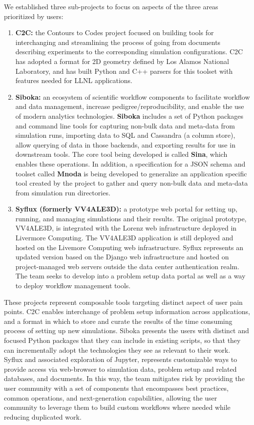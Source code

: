 We established three sub-projects to focus on aspects of the three areas prioritized by users:
\begin{enumerate}
\item \textbf{C2C:} the Contours to Codes project focused on building tools for
interchanging and streamlining the process of going from documents describing
experiments to the corresponding simulation configurations. C2C has adopted a
format for 2D geometry defined by Los Alamos National Laboratory, and has built
Python and C++ parsers for this toolset with features needed for LLNL
applications.  
\item \textbf{Siboka:} an ecosystem of scientific workflow components to
facilitate workflow and data management, increase pedigree/reproducibility, and
enable the use of modern analytics technologies.  \textbf{Siboka} includes a
set of Python packages and command line tools for capturing non-bulk data and
meta-data from simulation runs, importing data to SQL and Cassandra (a column
store), allow querying of data in those backends, and exporting results for use
in downstream tools. The core tool being developed is called \textbf{Sina},
which enables these  operations. In addition, a specification for a JSON
schema and toolset called \textbf{Mnoda} is being developed to generalize an
application specific tool created by the project to gather and query non-bulk
data and meta-data from simulation run directories.
\item \textbf{Syflux (formerly VV4ALE3D):} a prototype web portal for setting
up, running, and managing simulations and their results.  The original
prototype, VV4ALE3D, is integrated with the Lorenz web infrastructure deployed
in Livermore Computing.  The VV4ALE3D application is still deployed and hosted
on the Livemore Computing web infrastructure.  Syflux represents an updated
version based on the Django web infrastructure and hosted on project-managed
web servers outside the data center authentication realm. The team seeks to
develop into a problem setup data portal as well as a way to deploy workflow
management tools.  
\end{enumerate}
These projects represent composable tools targeting distinct aspect of user
pain points.  C2C enables interchange of problem setup information across
applications, and a format in which to store and curate the results of the time
consuming process of setting up new simulations.  Siboka presents the users
with distinct and focused Python packages that they can include in existing
scripts, so that they can incrementally adopt the technologies they see as
relevant to their work.  Syflux and associated exploration of Jupyter,
represents customizable ways to provide access via web-browser to simulation
data, problem setup and related databases, and documents.  In this way, the
team mitigates risk by providing the user community with a set of components
that encompasses best practices, common operations, and next-generation
capabilities, allowing the user community to leverage them to build custom
workflows where needed while reducing duplicated work.

